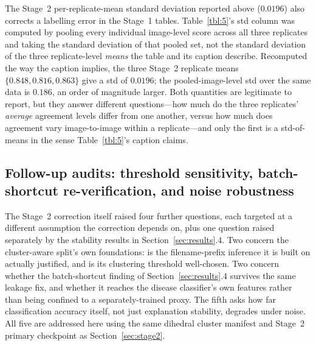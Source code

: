 The Stage~2 per-replicate-mean standard deviation reported above ($0.0196$) also corrects a labelling error in the Stage~1 tables. Table~\ref{tbl:5}'s std column was computed by pooling every individual image-level score across all three replicates and taking the standard deviation of that pooled set, not the standard deviation of the three replicate-level \textit{means} the table and its caption describe. Recomputed the way the caption implies, the three Stage~2 replicate means $\{0.848, 0.816, 0.863\}$ give a std of $0.0196$; the pooled-image-level std over the same data is $0.186$, an order of magnitude larger. Both quantities are legitimate to report, but they answer different questions---how much do the three replicates' \textit{average} agreement levels differ from one another, versus how much does agreement vary image-to-image within a replicate---and only the first is a std-of-means in the sense Table~\ref{tbl:5}'s caption claims.

\subsection{Follow-up audits: threshold sensitivity, batch-shortcut re-verification, and noise robustness}
\label{sec:followup-audits}

The Stage~2 correction itself raised four further questions, each targeted at a different assumption the correction depends on, plus one question raised separately by the stability results in Section~\ref{sec:results}.4. Two concern the cluster-aware split's own foundations: is the filename-prefix inference it is built on actually justified, and is its clustering threshold well-chosen. Two concern whether the batch-shortcut finding of Section~\ref{sec:results}.4 survives the same leakage fix, and whether it reaches the disease classifier's own features rather than being confined to a separately-trained proxy. The fifth asks how far classification accuracy itself, not just explanation stability, degrades under noise. All five are addressed here using the same dihedral cluster manifest and Stage~2 primary checkpoint as Section~\ref{sec:stage2}.

